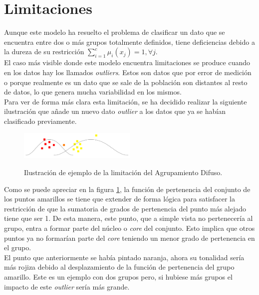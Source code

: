 \documentclass[]{report}
\begin{document}
		\section{Limitaciones}
		
			Aunque este modelo ha resuelto el problema de clasificar un dato que se encuentra entre dos o más grupos totalmente definidos, tiene deficiencias debido a la dureza de su restricción $\sum_{i=1}^c\mu_i(x_j) = 1, \forall j$.\\
			
			El caso más visible donde este modelo encuentra limitaciones se produce cuando en los datos hay los llamados \textit{outliers}. Estos son datos que por error de medición o porque realmente es un dato que se sale de la población son distantes al resto de datos, lo que genera mucha variabilidad en los mismos.\\
			
			Para ver de forma más clara esta limitación, se ha decidido realizar la siguiente ilustración que añade un nuevo dato \textit{outlier} a los datos que ya se habían clasificado previamente.
			
			\begin{figure}[h]
				\centering
				\includegraphics[width=0.5\textwidth]{problema-agrupamiento-difuso.jpg}
				\label{clustering_difuso_problema}
				\caption{Ilustración de ejemplo de la limitación del Agrupamiento Difuso.}
			\end{figure}
			
			Como se puede apreciar en la figura \ref{clustering_difuso_problema}, la función de pertenencia del conjunto de los puntos amarillos se tiene que extender de forma lógica para satisfacer la restricción de que la sumatoria de grados de pertenencia del punto más alejado tiene que ser 1. De esta manera, este punto, que a simple vista no pertenecería al grupo, entra a formar parte del núcleo o \textit{core} del conjunto. Esto implica que otros puntos ya no formarían parte del \textit{core} teniendo un menor grado de pertenencia en el grupo.\\
			
			El punto que anteriormente se había pintado naranja, ahora su tonalidad sería más rojiza debido al desplazamiento de la función de pertenencia del grupo amarillo. Este es un ejemplo con dos grupos pero, si hubiese más grupos el impacto de este \textit{outlier} sería más grande.
	
\end{document}
